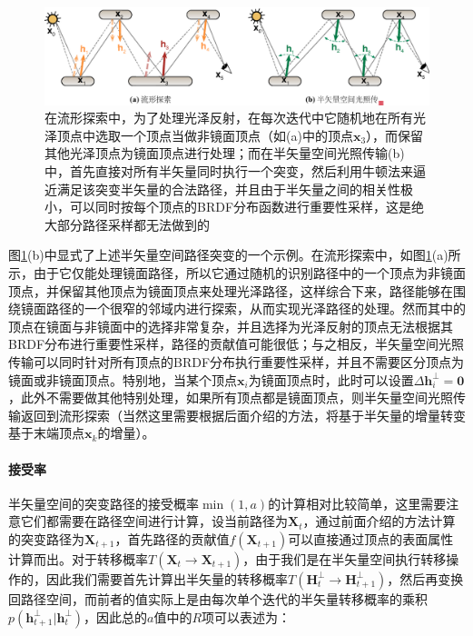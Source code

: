 \begin{figure}
\begin{fullwidth}
	\includegraphics[width=1.0\thewidth]{figures/mlt/me-vs-hslt}
	\caption{在流形探索中，为了处理光泽反射，在每次迭代中它随机地在所有光泽顶点中选取一个顶点当做非镜面顶点（如(a)中的顶点$\mathbf{x}_3$），而保留其他光泽顶点为镜面顶点进行处理；而在半矢量空间光照传输(b)中，首先直接对所有半矢量同时执行一个突变，然后利用牛顿法来逼近满足该突变半矢量的合法路径，并且由于半矢量之间的相关性极小，可以同时按每个顶点的BRDF分布函数进行重要性采样，这是绝大部分路径采样都无法做到的}
	\label{f:mlt-me-vs-hslt}
\end{fullwidth}
\end{figure}

图\ref{f:mlt-me-vs-hslt}(b)中显式了上述半矢量空间路径突变的一个示例。在流形探索中，如图\ref{f:mlt-me-vs-hslt}(a)所示，由于它仅能处理镜面路径，所以它通过随机的识别路径中的一个顶点为非镜面顶点，并保留其他顶点为镜面顶点来处理光泽路径，这样综合下来，路径能够在围绕镜面路径的一个很窄的邻域内进行探索，从而实现光泽路径的处理。然而其中的顶点在镜面与非镜面中的选择非常复杂，并且选择为光泽反射的顶点无法根据其BRDF分布进行重要性采样，路径的贡献值可能很低；与之相反，半矢量空间光照传输可以同时针对所有顶点的BRDF分布执行重要性采样，并且不需要区分顶点为镜面或非镜面顶点。特别地，当某个顶点$\mathbf{x}_i$为镜面顶点时，此时可以设置$\Delta\mathbf{h}^{\perp}_i=\mathbf{0}$，此外不需要做其他特别处理，如果所有顶点都是镜面顶点，则半矢量空间光照传输返回到流形探索（当然这里需要根据后面介绍的方法，将基于半矢量的增量转变基于末端顶点$\mathbf{x}_k$的增量）。



\paragraph{接受率}
半矢量空间的突变路径的接受概率$\min(1,a)$的计算相对比较简单，这里需要注意它们都需要在路径空间进行计算，设当前路径为$\mathbf{X}_t$，通过前面介绍的方法计算的突变路径为$\mathbf{X}_{t+1}$，首先路径的贡献值$f(\mathbf{X}_{t+1})$可以直接通过顶点的表面属性计算而出。对于转移概率$T(\mathbf{X}_t\to\mathbf{X}_{t+1})$，由于我们是在半矢量空间执行转移操作的，因此我们需要首先计算出半矢量的转移概率$T(\mathbf{H}^{\perp}_t\to\mathbf{H}^{\perp}_{t+1})$，然后再变换回路径空间，而前者的值实际上是由每次单个迭代的半矢量转移概率的乘积$p(\mathbf{h}^{\perp}_{t+1}|\mathbf{h}^{\perp}_t)$，因此总的$a$值中的$R$项可以表述为：

